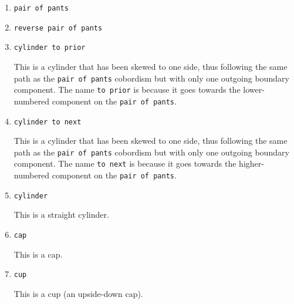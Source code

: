 \documentclass{ltxdoc}
\begin{document}
\begin{enumerate}
\item \Verb+pair of pants+


\item \Verb+reverse pair of pants+


\item \Verb+cylinder to prior+

This is a cylinder that has been skewed to one side, thus following the same path as the \Verb+pair of pants+ cobordism but with only one outgoing boundary component.
The name \Verb+to prior+ is because it goes towards the lower-numbered component on the \Verb+pair of pants+. 


\item \Verb+cylinder to next+

This is a cylinder that has been skewed to one side, thus following the same path as the \Verb+pair of pants+ cobordism but with only one outgoing boundary component.
The name \Verb+to next+ is because it goes towards the higher-numbered component on the \Verb+pair of pants+. 


\item \Verb+cylinder+

This is a straight cylinder.


\item \Verb+cap+

This is a cap.


\item \Verb+cup+

This is a cup (an upside-down cap).


\end{enumerate}
\end{document}
